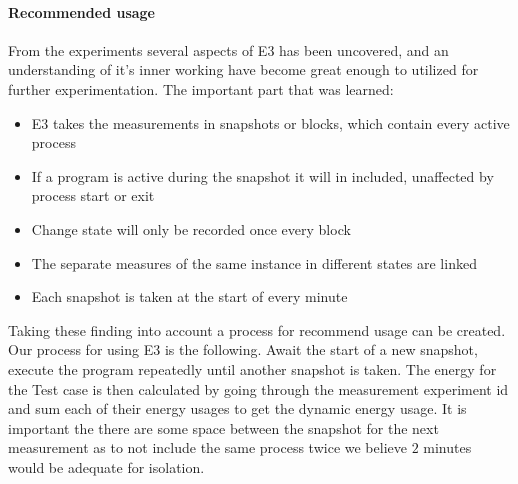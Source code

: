 \paragraph {Recommended usage}
From the experiments several aspects of E3 has been uncovered, and an understanding of it's inner working have become great enough to utilized for further experimentation. The important part that was learned:
\begin{itemize}
    \item E3 takes the measurements in snapshots or blocks, which contain every active process
    \item If a program is active during the snapshot it will in included, unaffected by process start or exit
    \item Change state will only be recorded once every block
    \item The separate measures of the same instance in different states are linked
    \item Each snapshot is taken at the start of every minute
\end{itemize} 
Taking these finding into account a process for recommend usage can be created. Our process for using E3 is the following.
Await the start of a new snapshot, execute the program repeatedly until another snapshot is taken. The energy for the Test case is then calculated by going through the measurement experiment id and sum each of their energy usages to get the dynamic energy usage. It is important the there are some space between the snapshot for the next measurement as to not include the same process twice we believe $2$ minutes would be adequate for isolation.